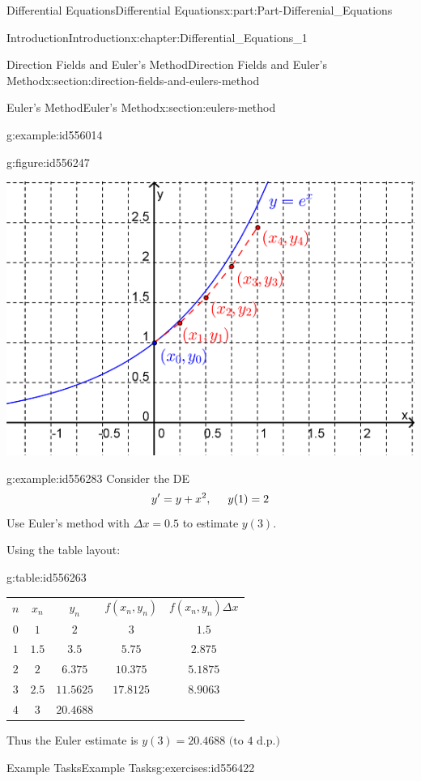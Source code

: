 \documentclass[oneside,10pt,]{book}
\newcommand{\tabularfont}{\relax}
\numberwithin{equation}{section}
\newcommand{\hrulethin}  {\noalign{\hrule height 0.04em}}
\begin{document}
\begin{partptx}{Differential Equations}{}{Differential Equations}{}{}{x:part:Part-Differenial_Equations}
\begin{chapterptx}{Introduction}{}{Introduction}{}{}{x:chapter:Differential_Equations_1}
\begin{sectionptx}{Direction Fields and Euler's Method}{}{Direction Fields and Euler's Method}{}{}{x:section:direction-fields-and-eulers-method}
\begin{sectionptx}{Euler's Method}{}{Euler's Method}{}{}{x:section:eulers-method}
\begin{example}{}{g:example:id556014}
\begin{figureptx}{}{g:figure:id556247}{}
\begin{image}{0.125}{0.75}{0.125}
\includegraphics[width=\linewidth]{./DifferentialEquations/Images/1/2_example11.png}
\end{image}%
\tcblower
\end{figureptx}%
%
\end{example}
\begin{example}{}{g:example:id556283}%
Consider the DE%
\begin{equation*}
y'=y+x^2, \hspace{5mm} y(1)=2
\end{equation*}
Use Euler’s method with \(\Delta x=0.5\) to estimate \(y(3)\).%
\par\smallskip%
\noindent\hypertarget{g:solution:id556259}{}Using the table layout: \begin{tableptx}{\textbf{}}{g:table:id556263}{}%
\centering%
{\tabularfont%
\begin{tabular}{ccccc}
\textbf{\(n\)}&\textbf{\(x_n\)}&\textbf{\(y_n\)}&\textbf{\(f(x_n,y_n)\)}&\textbf{\(f(x_n,y_n)\Delta x\)}\tabularnewline\hrulethin
\(0\)&\(1\)&\(2\)&\(3\)&\(1.5\)\tabularnewline[0pt]
\(1\)&\(1.5\)&\(3.5\)&\(5.75\)&\(2.875\)\tabularnewline[0pt]
\(2\)&\(2\)&\(6.375\)&\(10.375\)&\(5.1875\)\tabularnewline[0pt]
\(3\)&\(2.5\)&\(11.5625\)&\(17.8125\)&\(8.9063\)\tabularnewline[0pt]
\(4\)&\(3\)&\(20.4688\)&&
\end{tabular}
}%
\end{tableptx}%
 Thus the Euler estimate is \(y(3)=20.4688 \textrm{ (to 4 d.p.)}\)%
\end{example}
%
%
\typeout{************************************************}
\typeout{************************************************}
%
\begin{exercises-subsection-numberless}{Example Tasks}{}{Example Tasks}{}{}{g:exercises:id556422}

\end{exercises-subsection-numberless}
\end{sectionptx}
\end{sectionptx}
\end{chapterptx}
\end{partptx}
\end{document}
